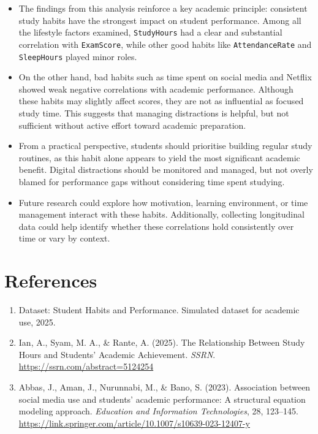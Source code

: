 \documentclass[
  11pt,
  a4paper,
]{article}
\begin{document}
\begin{itemize}
\item
  The findings from this analysis reinforce a key academic principle:
  consistent study habits have the strongest impact on student
  performance. Among all the lifestyle factors examined,
  \texttt{StudyHours} had a clear and substantial correlation with
  \texttt{ExamScore}, while other good habits like
  \texttt{AttendanceRate} and \texttt{SleepHours} played minor roles.
\item
  On the other hand, bad habits such as time spent on social media and
  Netflix showed weak negative correlations with academic performance.
  Although these habits may slightly affect scores, they are not as
  influential as focused study time. This suggests that managing
  distractions is helpful, but not sufficient without active effort
  toward academic preparation.
\item
  From a practical perspective, students should prioritise building
  regular study routines, as this habit alone appears to yield the most
  significant academic benefit. Digital distractions should be monitored
  and managed, but not overly blamed for performance gaps without
  considering time spent studying.
\item
  Future research could explore how motivation, learning environment, or
  time management interact with these habits. Additionally, collecting
  longitudinal data could help identify whether these correlations hold
  consistently over time or vary by context.
\end{itemize}

\section{References}\label{references}

\begin{enumerate}
\def\labelenumi{\arabic{enumi}.}
\item
  Dataset: Student Habits and Performance. Simulated dataset for
  academic use, 2025.
\item
  Ian, A., Syam, M. A., \& Rante, A. (2025). The Relationship Between
  Study Hours and Students' Academic Achievement. \emph{SSRN}.
  \url{https://ssrn.com/abstract=5124254}
\item
  Abbas, J., Aman, J., Nurunnabi, M., \& Bano, S. (2023). Association
  between social media use and students' academic performance: A
  structural equation modeling approach. \emph{Education and Information
  Technologies}, 28, 123--145.
  \url{https://link.springer.com/article/10.1007/s10639-023-12407-y}
\end{enumerate}


\printbibliography
\end{document}
